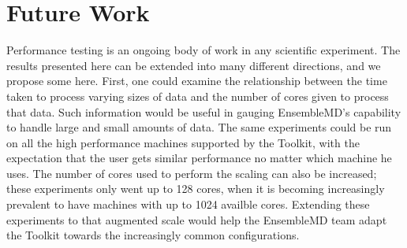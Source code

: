 \documentclass[]{article}
\begin{document}
\section{Future Work}
	Performance testing is an ongoing body of work in any scientific experiment. The results presented here can be extended into many different directions, and we propose some here. First, one could examine the relationship between the time taken to process varying sizes of data and the number of cores given to process that data. Such information would be useful in gauging EnsembleMD's capability to handle large and small amounts of data. The same experiments could be run on all the high performance machines supported by the Toolkit, with the expectation that the user gets similar performance no matter which machine he uses. The number of cores used to perform the scaling can also be increased; these experiments only went up to 128 cores, when it is becoming increasingly prevalent to have machines with up to 1024 availble cores. Extending these experiments to that augmented scale would help the EnsembleMD team adapt the Toolkit towards the increasingly common configurations.
\end{document}
